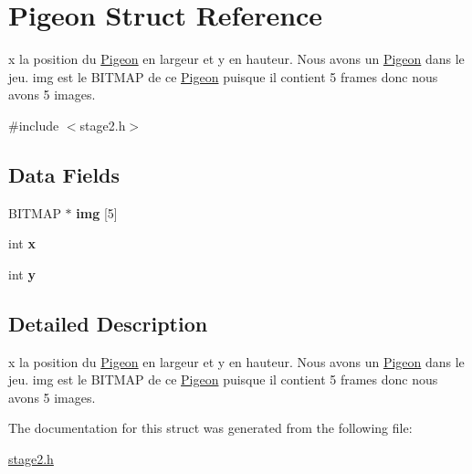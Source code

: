 \hypertarget{struct_pigeon}{\section{Pigeon Struct Reference}
\label{struct_pigeon}
}


x la position du \hyperlink{struct_pigeon}{Pigeon} en largeur et y en hauteur. Nous avons un \hyperlink{struct_pigeon}{Pigeon} dans le jeu. img est le B\-I\-T\-M\-A\-P de ce \hyperlink{struct_pigeon}{Pigeon} puisque il contient 5 frames donc nous avons 5 images.  




{\ttfamily \#include $<$stage2.\-h$>$}

\subsection*{Data Fields}
\begin{DoxyCompactItemize}
\item 
\hypertarget{struct_pigeon_a4206cc246eae0a153dd37253a8835ac9}{B\-I\-T\-M\-A\-P $\ast$ {\bfseries img} \mbox{[}5\mbox{]}}\label{struct_pigeon_a4206cc246eae0a153dd37253a8835ac9}

\item 
\hypertarget{struct_pigeon_a6150e0515f7202e2fb518f7206ed97dc}{int {\bfseries x}}\label{struct_pigeon_a6150e0515f7202e2fb518f7206ed97dc}

\item 
\hypertarget{struct_pigeon_a0a2f84ed7838f07779ae24c5a9086d33}{int {\bfseries y}}\label{struct_pigeon_a0a2f84ed7838f07779ae24c5a9086d33}

\end{DoxyCompactItemize}


\subsection{Detailed Description}
x la position du \hyperlink{struct_pigeon}{Pigeon} en largeur et y en hauteur. Nous avons un \hyperlink{struct_pigeon}{Pigeon} dans le jeu. img est le B\-I\-T\-M\-A\-P de ce \hyperlink{struct_pigeon}{Pigeon} puisque il contient 5 frames donc nous avons 5 images. 


\begin{DoxyItemize}
\item 
\end{DoxyItemize}

The documentation for this struct was generated from the following file\-:\begin{DoxyCompactItemize}
\item 
\hyperlink{stage2_8h}{stage2.\-h}\end{DoxyCompactItemize}
